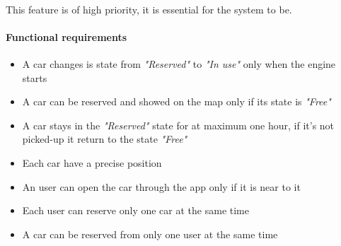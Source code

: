  \ \\
This feature is of high priority, it is essential for the system to be.
\paragraph{Functional requirements }
\begin{itemize}
	\item A car changes is state from \emph{"Reserved"} to \emph{"In use"} only when the engine starts
	\item A car can be reserved and showed on the map only if its state is \emph{"Free"}
	\item A car stays in the \emph{"Reserved"} state for at maximum one hour, if it's not picked-up it return to the state \emph{"Free"}
	\item Each car have a precise position
	\item An user can open the car through the app only if it is near to it
	\item Each user can reserve only one car at the same time
	\item A car can be reserved from only one user at the same time
\end{itemize}


